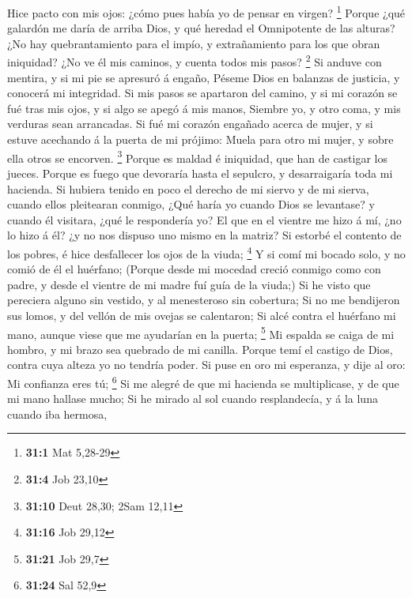  Hice pacto con mis ojos: ¿cómo pues había yo de pensar en
virgen? \footnote{\textbf{31:1} Mat 5,28-29}  Porque ¿qué
galardón me daría de arriba Dios, y qué heredad el Omnipotente de las
alturas?  ¿No hay quebrantamiento para el impío, y
extrañamiento para los que obran iniquidad?  ¿No ve él mis
caminos, y cuenta todos mis pasos? \footnote{\textbf{31:4} Job 23,10}
 Si anduve con mentira, y si mi pie se apresuró á engaño,
 Péseme Dios en balanzas de justicia, y conocerá mi
integridad.  Si mis pasos se apartaron del camino, y si mi
corazón se fué tras mis ojos, y si algo se apegó á mis manos,
 Siembre yo, y otro coma, y mis verduras sean arrancadas.
 Si fué mi corazón engañado acerca de mujer, y si estuve
acechando á la puerta de mi prójimo:  Muela para otro mi
mujer, y sobre ella otros se encorven. \footnote{\textbf{31:10} Deut
  28,30; 2Sam 12,11}  Porque es maldad é iniquidad, que
han de castigar los jueces.  Porque es fuego que
devoraría hasta el sepulcro, y desarraigaría toda mi hacienda.
 Si hubiera tenido en poco el derecho de mi siervo y de
mi sierva, cuando ellos pleitearan conmigo,  ¿Qué haría
yo cuando Dios se levantase? y cuando él visitara, ¿qué le respondería
yo?  El que en el vientre me hizo á mí, ¿no lo hizo á él?
¿y no nos dispuso uno mismo en la matriz?  Si estorbé el
contento de los pobres, é hice desfallecer los ojos de la viuda;
\footnote{\textbf{31:16} Job 29,12}  Y si comí mi bocado
solo, y no comió de él el huérfano;  (Porque desde mi
mocedad creció conmigo como con padre, y desde el vientre de mi madre
fuí guía de la viuda;)  Si he visto que pereciera alguno
sin vestido, y al menesteroso sin cobertura;  Si no me
bendijeron sus lomos, y del vellón de mis ovejas se calentaron;
 Si alcé contra el huérfano mi mano, aunque viese que me
ayudarían en la puerta; \footnote{\textbf{31:21} Job 29,7}
 Mi espalda se caiga de mi hombro, y mi brazo sea
quebrado de mi canilla.  Porque temí el castigo de Dios,
contra cuya alteza yo no tendría poder.  Si puse en oro
mi esperanza, y dije al oro: Mi confianza eres tú; \footnote{\textbf{31:24}
  Sal 52,9}  Si me alegré de que mi hacienda se
multiplicase, y de que mi mano hallase mucho;  Si he
mirado al sol cuando resplandecía, y á la luna cuando iba hermosa,
